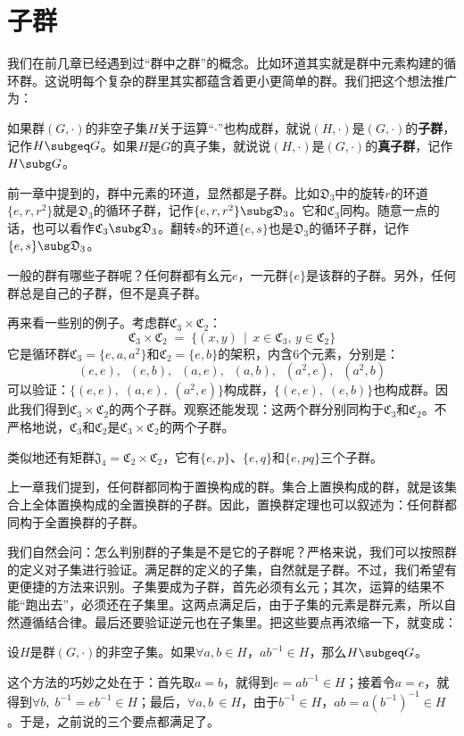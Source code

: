 \documentclass[12pt,UTF8,fontset=none]{ctexbook}
\begin{document}
\section{子群}

我们在前几章已经遇到过“群中之群”的概念。比如环道其实就是群中元素构建的循环群。这说明每个复杂的群里其实都蕴含着更小更简单的群。我们把这个想法推广为：
\begin{df}[子群]
    如果群$(G,\cdot)$的非空子集$H$关于运算“$\cdot$”也构成群，就说$(H,\cdot)$是$(G,\cdot)$的\textbf{子群}，记作$H\subgeq G$。如果$H$是$G$的真子集，就说说$(H,\cdot)$是$(G,\cdot)$的\textbf{真子群}，记作$H \subg G$。
\end{df}
前一章中提到的，群中元素的环道，显然都是子群。比如$\mathfrak{D}_3$中的旋转$r$的环道$\{e,r,r^2\}$就是$\mathfrak{D}_3$的循环子群，记作$\{e,r,r^2\}\subg \mathfrak{D}_3$。它和$\mathfrak{C}_3$同构。随意一点的话，也可以看作$\mathfrak{C}_3\subg \mathfrak{D}_3$。翻转$s$的环道$\{e,s\}$也是$\mathfrak{D}_3$的循环子群，记作$\{e,s\}\subg \mathfrak{D}_3$。

一般的群有哪些子群呢？任何群都有幺元$e$，一元群$\{e\}$是该群的子群。另外，任何群总是自己的子群，但不是真子群。

再来看一些别的例子。考虑群$\mathfrak{C}_3\times \mathfrak{C}_2$：
$$ \mathfrak{C}_3\times \mathfrak{C}_2 \;=\; \{(x,y)\,\mid\,x\in\mathfrak{C}_3,\,y\in\mathfrak{C}_2\} $$
它是循环群$\mathfrak{C}_3=\{e,a,a^2\}$和$\mathfrak{C}_2=\{e,b\}$的架积，内含$6$个元素，分别是：
$$
(e,e),\;\;(e,b),\;\;(a,e),\;\;(a,b),\;\;(a^2,e),\;\;(a^2,b)
$$
可以验证：$\{(e,e),\;(a,e),\;(a^2,e)\}$构成群，$\{(e,e),\;(e,b)\}$也构成群。因此我们得到$\mathfrak{C}_3\times \mathfrak{C}_2$的两个子群。观察还能发现：这两个群分别同构于$\mathfrak{C}_3$和$\mathfrak{C}_2$。不严格地说，$\mathfrak{C}_3$和$\mathfrak{C}_2$是$\mathfrak{C}_3\times \mathfrak{C}_2$的两个子群。

类似地还有矩群$\mathfrak{J}_4=\mathfrak{C}_2\times \mathfrak{C}_2$，它有$\{e,p\}$、$\{e,q\}$和$\{e,pq\}$三个子群。

上一章我们提到，任何群都同构于置换构成的群。集合上置换构成的群，就是该集合上全体置换构成的全置换群的子群。因此，置换群定理也可以叙述为：任何群都同构于全置换群的子群。

我们自然会问：怎么判别群的子集是不是它的子群呢？严格来说，我们可以按照群的定义对子集进行验证。满足群的定义的子集，自然就是子群。不过，我们希望有更便捷的方法来识别。子集要成为子群，首先必须有幺元；其次，运算的结果不能“跑出去”，必须还在子集里。这两点满足后，由于子集的元素是群元素，所以自然遵循结合律。最后还要验证逆元也在子集里。把这些要点再浓缩一下，就变成：
\begin{tm}[子群的判别方法]\label{tm:5-10}
    设$H$是群$(G,\cdot)$的非空子集。如果$\forall a,b \in H$，$ab^{-1}\in H$，那么$H\subgeq G$。
\end{tm}
这个方法的巧妙之处在于：首先取$a=b$，就得到$e = ab^{-1}\in H$；接着令$a=e$，就得到$\forall b,\;b^{-1} = eb^{-1}\in H$；最后，$\forall a,b\,\in H$，由于$b^{-1}\in H$，$ab = a\left(b^{-1}\right)^{-1}\in H$。于是，之前说的三个要点都满足了。
\end{document}
